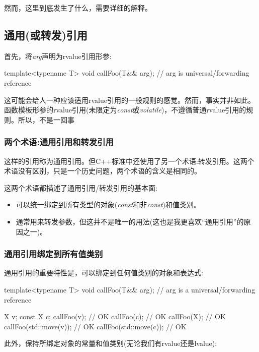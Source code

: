 然而，这里到底发生了什么，需要详细的解释。

\subsection{通用(或转发)引用}

首先，将\textit{arg}声明为rvalue引用形参:

\begin{cppcode}
template<typename T>
void callFoo(T&& arg); // arg is universal/forwarding reference
\end{cppcode}

这可能会给人一种应该适用rvalue引用的一般规则的感觉。然而，事实并非如此。函数模板形参的rvalue引用(未限定为\textit{const}或\textit{volatile})，不遵循普通rvalue引用的规则。所以，不是一回事

\subsubsection{两个术语:通用引用和转发引用}

这样的引用称为通用引用。但C++标准中还使用了另一个术语:转发引用。这两个术语没有区别，只是一个历史问题，两个术语的含义是相同的。

这两个术语都描述了通用引用/转发引用的基本面:

\begin{itemize}
	\item 可以统一绑定到所有类型的对象(\textit{const}和非\textit{const})和值类别。
	\item 通常用来转发参数，但这并不是唯一的用法(这也是我更喜欢“通用引用”的原因之一)。
\end{itemize}

\subsubsection{通用引用绑定到所有值类别}

通用引用的重要特性是，可以绑定到任何值类别的对象和表达式:

\begin{cppcode}
template<typename T>
void callFoo(T&& arg); // arg is a universal/forwarding reference

X v;
const X c;
callFoo(v); // OK
callFoo(c); // OK
callFoo(X{}); // OK
callFoo(std::move(v)); // OK
callFoo(std::move(c)); // OK
\end{cppcode}

此外，保持所绑定对象的常量和值类别(无论我们有rvalue还是lvalue):

